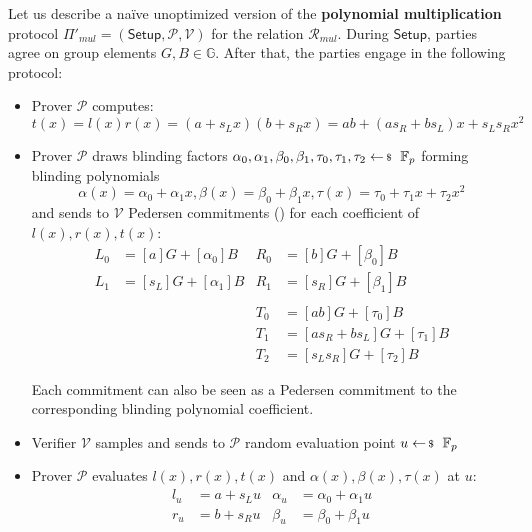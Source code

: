 \documentclass[../../book.tex]{subfiles}
\begin{document}
Let us describe a naïve unoptimized version of the \textbf{polynomial multiplication} protocol $\Pi'_{mul} = (\mathsf{Setup},\mathcal{P,V})$ for the relation $\mathcal{R}_{mul}$.
During $\mathsf{Setup}$, parties agree on group elements $G,B \in \mathbb{G}$. After that, the parties engage in the following protocol:
\begin{itemize}
    \item Prover $\mathcal{P}$ computes:
        $$t(x) = l(x)r(x) = (a+s_L x)(b+s_R x) = ab + (as_R + bs_L)x + s_L s_R x^2$$
    \item Prover $\mathcal{P}$ draws blinding factors $\alpha_0, \alpha_1, \beta_0, \beta_1, \tau_0, \tau_1, \tau_2 \leftarrowS \mathbb{F}_p$ forming blinding polynomials 
    $$\alpha(x) = \alpha_0 + \alpha_1 x, \beta(x) = \beta_0 + \beta_1 x, \tau(x) = \tau_0 + \tau_1 x + \tau_2 x^2$$
    and sends to $\mathcal{V}$ Pedersen commitments () for each coefficient of $l(x), r(x), t(x)$:
        \begin{equation}
            \begin{aligned}
                L_0 &= [a]G + [\alpha_0]B & R_0 &= [b]G + [\beta_0]B\\
                L_1 &= [s_L]G + [\alpha_1]B &  R_1 &= [s_R]G + [\beta_1]B\\
                &&&\\ %
                && T_0 &= [ab]G + [\tau_0]B \\
                && T_1 &= [as_R + bs_L]G + [\tau_1]B \\
                && T_2 &= [s_L s_R]G + [\tau_2]B
            \end{aligned}
        \end{equation}
        \begin{remark}
            Each commitment can also be seen as a Pedersen commitment to the corresponding blinding polynomial coefficient.
        \end{remark}
    \item Verifier $\mathcal{V}$ samples and sends to $\mathcal{P}$ random evaluation point $u \leftarrowS \mathbb{F}_p$
    \item Prover $\mathcal{P}$ evaluates $l(x),r(x),t(x)$ and $\alpha(x), \beta(x), \tau(x)$ at $u$:
        \begin{equation}
            \begin{aligned}
                l_u & = a + s_L u & \alpha_u &= \alpha_0 + \alpha_1 u\\
                r_u &= b + s_R u & \beta_u &= \beta_0 + \beta_1 u\\

\end{aligned}
\end{equation}
\end{itemize}
\end{document}
